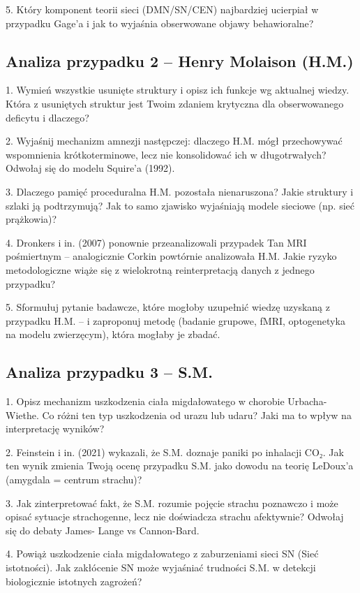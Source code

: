 \documentclass[11pt,a4paper]{article}
\begin{document}
5. Który komponent teorii sieci (DMN/SN/CEN) najbardziej ucierpiał w przypadku Gage'a i jak to wyjaśnia obserwowane objawy behawioralne?

\subsection{Analiza przypadku 2 – Henry Molaison (H.M.)}

1. Wymień wszystkie usunięte struktury i opisz ich funkcje wg
aktualnej wiedzy. Która z usuniętych struktur jest Twoim zdaniem
krytyczna dla obserwowanego deficytu i dlaczego?

2. Wyjaśnij mechanizm amnezji następczej: dlaczego H.M. mógł
przechowywać wspomnienia krótkoterminowe, lecz nie
konsolidować ich w długotrwałych? Odwołaj się do modelu
Squire'a (1992).

3. Dlaczego pamięć proceduralna H.M. pozostała nienaruszona?
Jakie struktury i szlaki ją podtrzymują? Jak to samo zjawisko
wyjaśniają modele sieciowe (np. sieć prążkowia)?

4. Dronkers i in. (2007) ponownie przeanalizowali przypadek Tan
MRI pośmiertnym – analogicznie Corkin powtórnie analizowała
H.M. Jakie ryzyko metodologiczne wiąże się z wielokrotną
reinterpretacją danych z jednego przypadku?

5. Sformułuj pytanie badawcze, które mogłoby uzupełnić wiedzę
uzyskaną z przypadku H.M. – i zaproponuj metodę (badanie
grupowe, fMRI, optogenetyka na modelu zwierzęcym), która
mogłaby je zbadać.

\subsection{Analiza przypadku 3 – S.M.}


1. Opisz mechanizm uszkodzenia ciała migdałowatego w chorobie
Urbacha-Wiethe. Co różni ten typ uszkodzenia od urazu lub
udaru? Jaki ma to wpływ na interpretację wyników?

2. Feinstein i in. (2021) wykazali, że S.M. doznaje paniki po inhalacji
CO₂. Jak ten wynik zmienia Twoją ocenę przypadku S.M. jako
dowodu na teorię LeDoux'a (amygdala = centrum strachu)?

3. Jak zinterpretować fakt, że S.M. rozumie pojęcie strachu
poznawczo i może opisać sytuacje strachogenne, lecz nie
doświadcza strachu afektywnie? Odwołaj się do debaty James-
Lange vs Cannon-Bard.

4. Powiąż uszkodzenie ciała migdałowatego z zaburzeniami sieci SN
(Sieć istotności). Jak zakłócenie SN może wyjaśniać trudności S.M.
w detekcji biologicznie istotnych zagrożeń?
\end{document}
